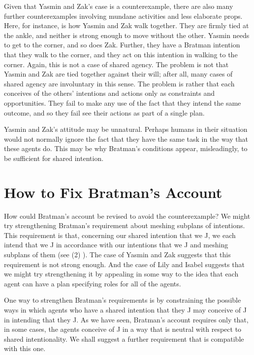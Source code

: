 \documentclass[12pt,\papersize]{extarticle}
\begin{document}
Given that Yasmin and Zak's case is a counterexample,
there are also many further counterexamples involving mundane activities and less elaborate props.
Here, for instance, is how Yasmin and Zak walk together.
They are firmly tied at the ankle, and neither is strong enough to move without the other.
Yasmin needs to get to the corner, and so does Zak.
Further, they have a Bratman intention that they walk to the corner, and they act on this intention in walking to the corner.
Again, this is not a case of shared agency.
The problem is not that Yasmin and Zak are tied together against their will; 
after all, many cases of shared agency are involuntary in this sense.
The problem is rather that each conceives of the others' intentions and actions only as constraints and opportunities.
They fail to make any use of the fact that they intend the same outcome,
 and so they fail see their actions as part of a single plan.

Yasmin and Zak's attitude may be unnatural.
Perhaps humans in their situation would not normally ignore the fact that they have the same task in the way that these agents do.
This may be why Bratman's conditions appear, misleadingly, to be sufficient for shared intention.



\section{How to Fix Bratman's Account}
\label{sec:fix}

How could Bratman's account be revised to avoid the counterexample?
We might try strengthening Bratman's requirement about meshing subplans of intentions.
This requirement is that, concerning our shared intention that we J, we each intend that we J in accordance with our intentions that we J and meshing subplans of them (see (2) ).
The case of Yasmin and Zak suggests that this requirement is not strong enough.
And the case of Lily and Isabel suggests that we might try strengthening it by appealing in some way to the idea that each agent can have a plan specifying roles for all of the agents.

One way to strengthen Bratman's requirements is by constraining the possible ways in which agents who have a shared intention that they J may conceive of J in intending that they J.
As we have seen, Bratman's account requires only that, in some cases, the agents conceive of J in a way that is neutral with respect to shared intentionality.
We shall suggest a further requirement that is compatible with this one.
\end{document}
